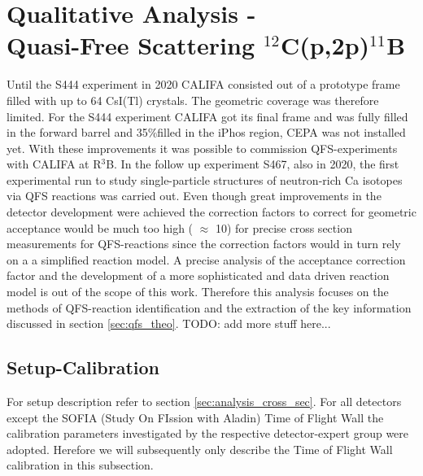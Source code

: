\section{Qualitative Analysis - \\Quasi-Free Scattering $^{12}$C(p,2p)$^{11}$B}\label{sec_analysis_qfs}
Until the S444 experiment in 2020 CALIFA consisted out of a prototype frame filled with up to 64 CsI(Tl) crystals. The geometric coverage was therefore limited. For the S444 experiment CALIFA got its final frame and was fully filled in the forward barrel and 35\%filled in the iPhos region, CEPA was not installed yet. With these improvements it was possible to commission QFS-experiments with CALIFA at R$^3$B. In the follow up experiment S467, also in 2020, the first experimental run to study single-particle structures of neutron-rich Ca isotopes via QFS reactions was carried out.\newline
Even though great improvements in the detector development  were achieved the correction factors to correct for geometric acceptance would be much too high ( $\approx$ 10) for precise cross section measurements for QFS-reactions since the correction factors would in turn rely on a a simplified reaction model. A precise analysis of the acceptance correction factor and the development of a more sophisticated and data driven reaction model is out of the scope of this work. Therefore this analysis focuses on the methods of QFS-reaction identification and the extraction of the key information discussed in section \ref{sec:qfs_theo}. TODO: add more stuff here...\newline
\subsection{Setup-Calibration}
For setup description refer to section \ref{sec:analysis_cross_sec}. For all detectors except the SOFIA (Study On FIssion with Aladin) Time of Flight Wall the calibration parameters investigated by the respective detector-expert group were adopted. Herefore we will subsequently only describe the Time of Flight Wall calibration in this subsection.
